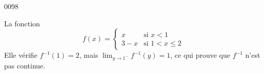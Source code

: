 
\begin{corrige}{0098}

La fonction 
\begin{equation}
	f(x)=\begin{cases}
	x	&	\text{si $x<1$}\\
	3-x	&	 \text{si $1<x\leq2$}
\end{cases}
\end{equation}
Elle vérifie $f^{-1}(1)=2$, mais $\lim_{y\to 1^-}f^{-1}(y)=1$, ce qui prouve que $f^{-1}$ n'est pas continue.

\end{corrige}
